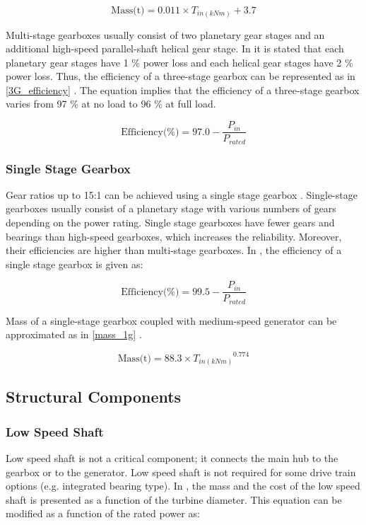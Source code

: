\documentclass{article}\usepackage{graphicx, color}
\begin{document}
\begin{equation}
\text{Mass(t)} = 0.011 \times T_{in(kNm)} + 3.7
\label{3G_gearbox}
\end{equation}

Multi-stage gearboxes usually consist of two planetary gear stages and an additional high-speed parallel-shaft helical gear stage. In \cite{Hau2005a} it is stated that each planetary gear stages have 1 \% power loss and each helical gear stages have 2 \% power loss. Thus, the efficiency of a three-stage gearbox can be represented as in \autoref{3G_efficiency} \cite{Zhang2011a}. The equation implies that the efficiency of a three-stage gearbox varies from 97 \% at no load to 96 \% at full load.

\begin{equation}
  \text{Efficiency(\%)} = 97.0 - \dfrac{P_{in}}{P_{rated}}
  \label{3G_efficiency}
\end{equation}

\subsubsection{Single Stage Gearbox}

Gear ratios up to 15:1 can be achieved using a single stage gearbox \cite{Cotrell2002}. Single-stage gearboxes usually consist of a planetary stage with various numbers of gears depending on the power rating. Single stage gearboxes have fewer gears and bearings than high-speed gearboxes, which increases the reliability. Moreover, their efficiencies are higher than multi-stage gearboxes. In \cite{Matveev2011}, the efficiency of a single stage gearbox is given as:

\begin{equation}
  \text{Efficiency(\%)} = 99.5 - \dfrac{P_{in}}{P_{rated}}
\end{equation}

Mass of a single-stage gearbox coupled with medium-speed generator can be approximated as in \autoref{mass_1g}  \cite{Fingersh2006}. 

\begin{equation}
	\text{Mass(t)} = 88.3 \times {T_{in(kNm)}}^{0.774}
  \label{mass_1g}
\end{equation}


\subsection{Structural Components}

\subsubsection{Low Speed Shaft}
Low speed shaft is not a critical component; it connects the main hub to the gearbox or to the generator. Low speed shaft is not required for some drive train options (e.g. integrated bearing type). In \cite{Fingersh2006}, the mass and the cost of the low speed shaft is presented as a function of the turbine diameter. This equation can be modified as a function of the rated power as:
\end{document}
